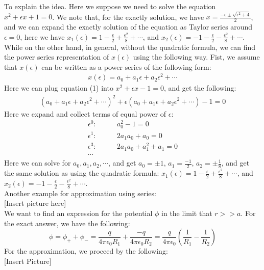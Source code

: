 \documentclass[11pt]{article}
\theoremstyle{break}
\theoremstyle{break}
\begin{document}
To explain the idea. Here we suppose we need to solve the equation $x^2+\epsilon x+1 = 0$. We note that, for the exactly solution, we have $x = \frac{-\epsilon \pm \sqrt{\epsilon^2 +4}}{2}$, and we can expand the exactly solution of the equation as Taylor series around $\epsilon = 0$, here we have $x_1(\epsilon) = 1-\frac{\epsilon}{2}+\frac{\epsilon^2}{8}+\cdots$, and $x_2(\epsilon) = -1 -\frac{\epsilon}{2}-\frac{\epsilon^2}{8}+\cdots$. While on the other hand, in general, without the quadratic formula, we can find the power series representation of $x(\epsilon)$ using the following way. Fist, we assume that $x(\epsilon)$ can be written as a power series of the following form: 
\begin{align}
x(\epsilon) = a_0 +a_1\epsilon + a_2\epsilon^2 +\cdots
\end{align}
Here we can plug equation (1) into $x^2+\epsilon x-1 = 0$, and get the following: 
\begin{align*}
(a_0+a_1\epsilon +a_2\epsilon^2 + \cdots)^2 + \epsilon(a_0+a_1\epsilon+a_2\epsilon^2+\cdots)-1 = 0
\end{align*}
Here we expand and collect terms of equal power of $\epsilon$:
\begin{align*}
\epsilon^0: &\qquad a_0^2 - 1 = 0\\
\epsilon^1: &\qquad 2a_1a_0+a_0 = 0\\
\epsilon^3: &\qquad 2a_1a_0+a_1^2+a_1 = 0\\
\cdots
\end{align*}
Here we can solve for $a_0,a_1,a_2,\cdots $, and get $a_0 = \pm 1$, $a_1 = \frac{-1}{2}$, $a_2 = \pm\frac{1}{8}$, and get the same solution as using the quadratic formula:  $x_1(\epsilon) = 1-\frac{\epsilon}{2}+\frac{\epsilon^2}{8}+\cdots$, and $x_2(\epsilon) = -1 -\frac{\epsilon}{2}-\frac{\epsilon^2}{8}+\cdots$.\\
\hfill\break\hfill\break
Another example for approximation using series:\\

[Insert picture here]\\

We want to find an expression for the potential $\phi$ in the limit that $r>>a$. For the exact answer, we have the following:
$$\phi  = \phi_+ + \phi_- = \frac{q}{4\pi\epsilon_0 R_1} + \frac{-q}{4\pi\epsilon_0 R_2} = \frac{q}{4\pi\epsilon_0}\left(\frac{1}{R_1}-\frac{1}{R_2}\right)$$
For the approximation, we proceed by the following:\\

[Insert Picture]\\
\end{document}
